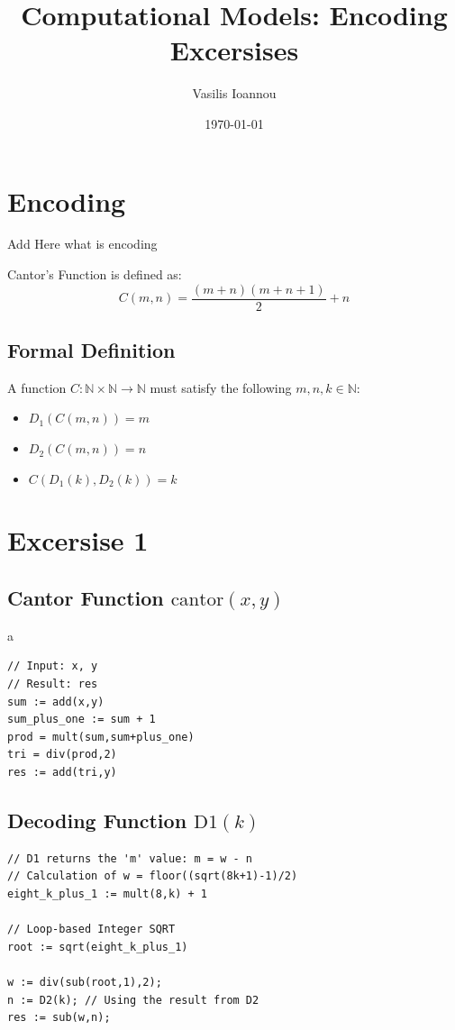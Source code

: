 \documentclass[11pt,a4paper]{article}
\title{Computational Models: Encoding Excersises}
\author{Vasilis Ioannou}
\date{\today}
\begin{document}
\maketitle

\section*{Encoding}

Add Here what is encoding

Cantor's Function is defined as:
\[ C(m, n) = \frac{(m+n)(m+n+1)}{2} + n \]

\subsection*{Formal Definition}
A function $C: \mathbb{N} \times \mathbb{N} \to \mathbb{N}$ must satisfy the following $m, n, k \in \mathbb{N}$:
\begin{itemize}
    \item $D_1(C(m, n)) = m$ 
    \item $D_2(C(m, n)) = n$ 
    \item $C(D_1(k), D_2(k)) = k$ 
\end{itemize}

\pagebreak
\section*{Excersise 1}

\subsection*{ Cantor Function $\text{cantor}(x, y)$}a

\begin{lstlisting}[language=LOOP]
// Input: x, y
// Result: res
sum := add(x,y)
sum_plus_one := sum + 1
prod = mult(sum,sum+plus_one)
tri = div(prod,2)
res := add(tri,y)
\end{lstlisting}

\subsection*{ Decoding Function $\text{D1}(k)$}

\begin{lstlisting}[language=LOOP]
// D1 returns the 'm' value: m = w - n
// Calculation of w = floor((sqrt(8k+1)-1)/2)
eight_k_plus_1 := mult(8,k) + 1

// Loop-based Integer SQRT
root := sqrt(eight_k_plus_1)

w := div(sub(root,1),2);
n := D2(k); // Using the result from D2
res := sub(w,n);
\end{lstlisting}
\end{document}
